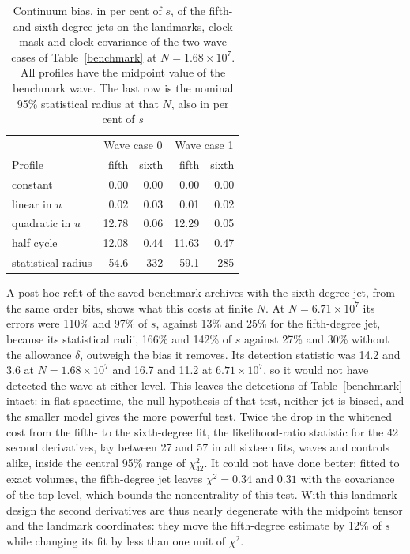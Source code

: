 \documentclass[11pt,a4paper]{article}
\begin{document}
\begin{table}[t]
\centering\small
\caption{Continuum bias, in per cent of $s$, of the fifth- and sixth-degree
jets on the landmarks, clock mask and clock covariance of the two wave cases
of Table~\ref{benchmark} at $N=1.68\times10^7$. All profiles have the
midpoint value of the benchmark wave. The last row is the nominal 95\%
statistical radius at that $N$, also in per cent of $s$}
\label{biastable}
\begin{tabular}{lrrrr}
\toprule
 & \multicolumn{2}{c}{Wave case 0} & \multicolumn{2}{c}{Wave case 1}\\
Profile & fifth & sixth & fifth & sixth\\
\midrule
constant & 0.00 & 0.00 & 0.00 & 0.00\\
linear in $u$ & 0.02 & 0.03 & 0.01 & 0.02\\
quadratic in $u$ & 12.78 & 0.06 & 12.29 & 0.05\\
half cycle & 12.08 & 0.44 & 11.63 & 0.47\\
\midrule
statistical radius & 54.6 & 332 & 59.1 & 285\\
\bottomrule
\end{tabular}
\end{table}

A post hoc refit of the saved benchmark archives with the sixth-degree jet,
from the same order bits, shows what this costs at finite $N$. At
$N=6.71\times10^7$ its errors were 110\% and 97\% of $s$, against 13\% and
25\% for the fifth-degree jet, because its statistical radii, 166\% and
142\% of $s$ against 27\% and 30\% without the allowance $\delta$, outweigh
the bias it removes. Its detection statistic was 14.2 and 3.6 at
$N=1.68\times10^7$ and 16.7 and 11.2 at $6.71\times10^7$, so it would not
have detected the wave at either level. This leaves the detections of
Table~\ref{benchmark} intact: in flat spacetime, the null hypothesis of that
test, neither jet is biased, and the smaller model gives the more powerful
test. Twice the drop in the whitened cost from the fifth- to the
sixth-degree fit, the likelihood-ratio statistic for the 42 second
derivatives, lay between 27 and 57 in all sixteen fits, waves and controls
alike, inside the central 95\% range of $\chi^2_{42}$. It could not have
done better: fitted to exact volumes, the fifth-degree jet leaves
$\chi^2=0.34$ and $0.31$ with the covariance of the top level, which bounds
the noncentrality of this test. With this landmark design the second
derivatives are thus nearly degenerate with the midpoint tensor and the
landmark coordinates: they move the fifth-degree estimate by 12\% of $s$
while changing its fit by less than one unit of $\chi^2$.
\end{document}
